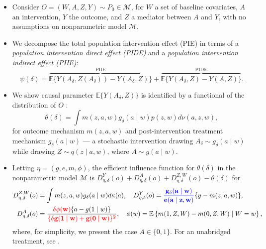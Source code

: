 \documentclass[landscape,a0paper,fontscale=0.285]{baposter} %
\begin{document}
\begin{poster}
{\begin{itemize}
\itemsep0.25pt
\item Consider $O = (W, A, Z, Y) \sim P_0 \in \mathcal{M}$, for $W$ a set of
  baseline covariates, $A$ an intervention, $Y$ the outcome, and $Z$ a mediator
  between $A$ and $Y$, with no assumptions on nonparametric model $\mathcal{M}$.
\item We decompose the total population intervention effect (PIE) in terms of a
  \textit{population intervention direct effect (PIDE)} and a \textit{population
  intervention indirect effect (PIIE)}:
  \begin{equation*}
    \psi(\delta) = \overbrace{\mathbb{E}\{Y(A_\delta, Z(A_\delta)) -
       Y(A_\delta, Z)\}}^{\text{PIIE}} + \overbrace{\mathbb{E}\{Y(A_\delta, Z)
       - Y(A, Z)\}}^{\text{PIDE}}.
  \end{equation*}
\item We show causal parameter $\mathbb{E}\{Y(A_\delta, Z)\}$ is identified by a
  functional of the distribution of $O$ \cite{diaz2019causal}:
  \begin{equation*}
    \theta(\delta) = \int m(z, a, w)g_{\delta}(a\mid w)p(z,w) d\nu(a,z,w),
  \end{equation*}
  for outcome mechanism $m(z,a,w)$ and post-intervention treatment mechanism
  $g_{\delta}(a\mid w)$ --- a stochastic intervention drawing
  $A_{\delta} \sim g_{\delta}(a \mid w)$ while drawing $Z \sim q(z \mid a, w)$,
  where $A \sim g(a \mid w)$.
\item Letting $\eta = (g, e, m, \phi)$, the efficient influence function for
  $\theta(\delta)$ in the nonparametric model $\mathcal{M}$ is
  $D^Y_{\eta, \delta}(o) + D^A_{\eta, \delta}(o) + D^{Z, W}_{\eta, \delta}(o) -
  \theta(\delta)$ for
  \vspace{-0.5em}
  \begin{align*}
    D^{Z, W}_{\eta, \delta}(o) &= \int m(z, a, w) g_{\delta}(a \mid w)
      d\kappa(a),
    \quad
    D^Y_{\eta, \delta}(o) = \mathbf{\textcolor{blue}{\frac{g_{\delta}(a \mid w)}
      {e(a \mid z, w)}}} \{y - m(z,a,w) \},\\
    D^A_{\eta,\delta}(o) &= \frac{\mathbf{\textcolor{red}{\delta\phi(w)}}\{a -
      g(1 \mid w)\}}{\mathbf{\textcolor{red}{\{\delta g(1 \mid w) +
      g(0 \mid w)\}^2}}},
    \quad
    \phi(w) = \mathbb{E}\left\{m(1, Z, W) - m(0, Z, W) \mid W = w \right\},
  \end{align*}
  where, for simplicity, we present the case $A \in \{0, 1\}$. For an unabridged
  treatment, see \cite{diaz2019causal}.
\end{itemize}
\vspace{0.5cm} %
}

\end{poster}
\end{document}
